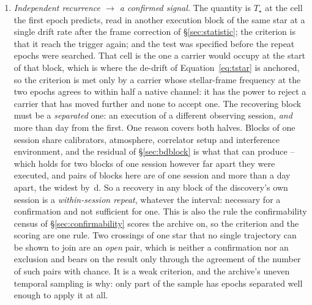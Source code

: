 \begin{enumerate}[label=(\roman*),leftmargin=1.9em,itemsep=3pt,topsep=3pt,parsep=0pt]
(Appendix~\ref{app:linemask}).
\item \emph{Independent recurrence $\to$ a confirmed signal.} The quantity is
$T_\star$ at the cell the first epoch predicts, read in another execution
block of the same star at a single drift rate after the frame correction of
\S\ref{sec:statistic}; the criterion is that it reach the trigger again; and
the test was specified before the repeat epochs were searched. That cell is the one a carrier would occupy at the start of that block,
which is where the de-drift of Equation~\ref{eq:tstar} is anchored, so the
criterion is met only by a carrier whose stellar-frame frequency at the two
epochs agrees to within half a native channel: it has the power to reject a
carrier that has moved further and none to accept one. The
recovering block must be a \emph{separated} one: an execution of a different
observing session, \emph{and} more than \EpSep{} day from the first. One
reason covers both halves. Blocks of one session share calibrators,
atmosphere, correlator setup and interference environment, and the residual
of \S\ref{sec:bdblock} is what that can produce -- which holds for two blocks
of one session however far apart they were executed, and \QfNPairDrop{} pairs
of blocks here are of one session and more than a day apart, the widest by
\QfSameSessMaxD\,d. So a recovery in any block of the discovery's own session
is a \emph{within-session repeat}, whatever the interval: necessary for a
confirmation and not sufficient for one. This is also the rule the
confirmability census of \S\ref{sec:confirmability} scores the archive on, so
the criterion and the scoring are one rule. Two crossings
of one star that no single trajectory can be shown to join are an \emph{open}
pair, which is neither a confirmation nor
an exclusion and bears on the result only through the agreement of the number
of such pairs with chance. It is a weak criterion, and the archive's uneven
temporal sampling is why: only part of the sample has epochs separated well
enough to apply it at all.
\end{enumerate}

